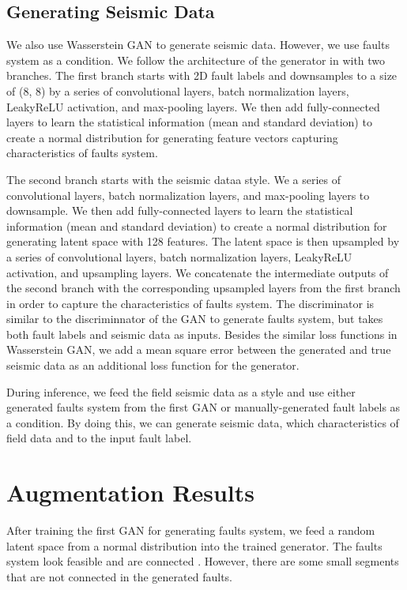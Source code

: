 \subsection{Generating Seismic Data}
We also use Wasserstein GAN to generate seismic data. However, we use faults system as a condition. We follow the architecture of the generator in \cite{pandey2020} with two branches. The first branch starts with 2D fault labels and downsamples to a size of (8, 8) by a series of convolutional layers, batch normalization layers, LeakyReLU activation, and max-pooling layers. We then add fully-connected layers to learn the statistical information (mean and standard deviation) to create a normal distribution for generating feature vectors capturing characteristics of faults system. 

The second branch starts with the seismic dataa style. We  a series of convolutional layers, batch normalization layers, and max-pooling layers to downsample. We then add fully-connected layers to learn the statistical information (mean and standard deviation) to create a normal distribution for generating latent space with 128 features. The latent space is then upsampled by a series of convolutional layers, batch normalization layers, LeakyReLU activation, and upsampling layers. We concatenate the intermediate outputs of the second branch with the corresponding upsampled layers from the first branch in order to capture the characteristics of faults system. The discriminator is similar to the discriminnator of the GAN to generate faults system, but takes both fault labels and seismic data as inputs. Besides the similar loss functions in Wasserstein GAN, we add a mean square error between the generated and true seismic data as an additional loss function for the generator.

During inference, we feed the field seismic data as a style and use either generated faults system from the first GAN or manually-generated fault labels as a condition. By doing this, we can generate seismic data, which  characteristics of field data and  to the input fault label.     

\section{Augmentation Results}
After training the first GAN for generating faults system, we feed a random latent space from a normal distribution into the trained generator. The  faults system look feasible and are connected . However, there are some small segments that are not connected in the generated faults.

